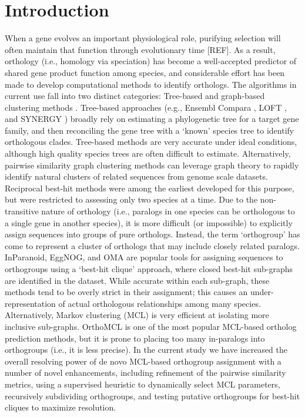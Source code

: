 \documentclass[nogrid]{MBE}%
\begin{document}
\section{{Introduction}\label{sec:Intro}}
When a gene evolves an important physiological role, purifying selection will often maintain that function through evolutionary time [REF]. As a result, orthology (i.e., homology via speciation) has become a well-accepted predictor of shared gene product function among species, and considerable effort has been made to develop computational methods to identify orthologs. The algorithms in current use fall into two distinct categories: Tree-based and graph-based clustering methods \cite{Tekaia:2016ga}. Tree-based approaches (e.g., Ensembl Compara \cite{Vilella:2009ju}, LOFT \cite{vanderHeijden:2007bo}, and SYNERGY \cite{Wapinski:2007fa}) broadly rely on estimating a phylogenetic tree for a target gene family, and then reconciling the gene tree with a `known' species tree to identify orthologous clades. Tree-based methods are very accurate under ideal conditions, although high quality species trees are often difficult to estimate. Alternatively, pairwise similarity graph clustering methods can leverage graph theory to rapidly identify natural clusters of related sequences from genome scale datasets. Reciprocal best-hit methods were among the earliest developed for this purpose, but were restricted to assessing only two species at a time. Due to the non-transitive nature of orthology (i.e., paralogs in one species can be orthologous to a single gene in another species), it is more difficult (or impossible) to explicitly assign sequences into groups of pure orthologs. Instead, the term `orthogroup' has come to represent a cluster of orthologs that may include closely related paralogs. InParanoid, EggNOG, and OMA are popular tools for assigning sequences to orthogroups using a `best-hit clique' approach, where closed best-hit sub-graphs are identified in the dataset. While accurate within each sub-graph, these methods tend to be overly strict in their assignment; this causes an under-representation of actual orthologous relationships among many species. Alternatively, Markov clustering (MCL) is very efficient at isolating more inclusive sub-graphs. OrthoMCL is one of the most popular MCL-based ortholog prediction methods, but it is prone to placing too many in-paralogs into orthogroups (i.e., it is less precise). In the current study we have increased the overall resolving power of de novo MCL-based orthogroup assignment with a number of novel enhancements, including refinement of the pairwise similarity metrics, using a supervised heuristic to dynamically select MCL parameters, recursively subdividing orthogroups, and testing putative orthogroups for best-hit cliques to maximize resolution.
\end{document}
